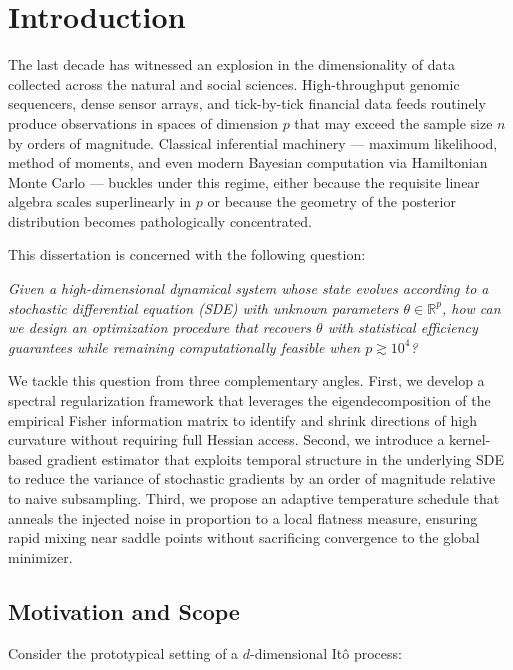 \documentclass[12pt,letterpaper,twoside]{report}
\begin{document}
\chapter{Introduction}

The last decade has witnessed an explosion in the dimensionality of data collected across the natural and social sciences. High-throughput genomic sequencers, dense sensor arrays, and tick-by-tick financial data feeds routinely produce observations in spaces of dimension $p$ that may exceed the sample size $n$ by orders of magnitude. Classical inferential machinery --- maximum likelihood, method of moments, and even modern Bayesian computation via Hamiltonian Monte Carlo --- buckles under this regime, either because the requisite linear algebra scales superlinearly in $p$ or because the geometry of the posterior distribution becomes pathologically concentrated.

This dissertation is concerned with the following question:

\begin{quotebox}
\noindent\textit{Given a high-dimensional dynamical system whose state evolves according to a stochastic differential equation (SDE) with unknown parameters $\theta \in \mathbb{R}^{p}$, how can we design an optimization procedure that recovers $\theta$ with statistical efficiency guarantees while remaining computationally feasible when $p \gtrsim 10^{4}$?}
\end{quotebox}

\noindent We tackle this question from three complementary angles. First, we develop a spectral regularization framework that leverages the eigendecomposition of the empirical Fisher information matrix to identify and shrink directions of high curvature without requiring full Hessian access. Second, we introduce a kernel-based gradient estimator that exploits temporal structure in the underlying SDE to reduce the variance of stochastic gradients by an order of magnitude relative to naive subsampling. Third, we propose an adaptive temperature schedule that anneals the injected noise in proportion to a local flatness measure, ensuring rapid mixing near saddle points without sacrificing convergence to the global minimizer.

\section{Motivation and Scope}

Consider the prototypical setting of a $d$-dimensional It\^{o} process:
\end{document}

